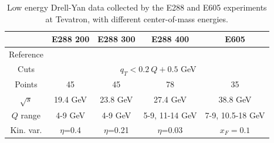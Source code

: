 \documentclass[aps,preprintnumbers,showpacs,nofootinbib,superscriptaddress,floatfix]{revtex4}
\begin{document}
\begin{table}[h!]
\begin{center}
\renewcommand{\tabcolsep}{0.4pc} %
\renewcommand{\arraystretch}{1.2} %
\begin{tabular}{|c|c|c|c|c|}
 \hline
 ~                        &  E288 200    &  E288 300        &  E288 400          &  E605                \\
 \hline
Reference               &  \cite{Ito:1980ev}  &   \cite{Ito:1980ev}  &  \cite{Ito:1980ev}  &   \cite{Moreno:1990sf}  \\
\hline
Cuts             & \multicolumn{4}{c|}{$q_T < 0.2\ Q +0.5$ GeV}
\\
 \hline
 Points                   &      45      &   45             &       78           &     35               \\
 \hline
 $\sqrt{s}$               &    19.4 GeV   &   23.8 GeV        &      27.4 GeV    &  38.8 GeV           \\
\hline
$Q$ range                 &  4-9 GeV      &  4-9 GeV         &  5-9, 11-14 GeV   &  7-9, 10.5-18 GeV   \\
 \hline
 Kin. var.           & $\eta$=0.4         &  $\eta$=0.21          &   $\eta$=0.03         &    $x_F=0.1$         \\
\hline
\end{tabular}
\caption{Low energy Drell-Yan data collected by the E288 and E605 experiments at Tevatron, with different center-of-mass energies.}
\label{t:data_DY}
\end{center}
\end{table}
\end{document}
